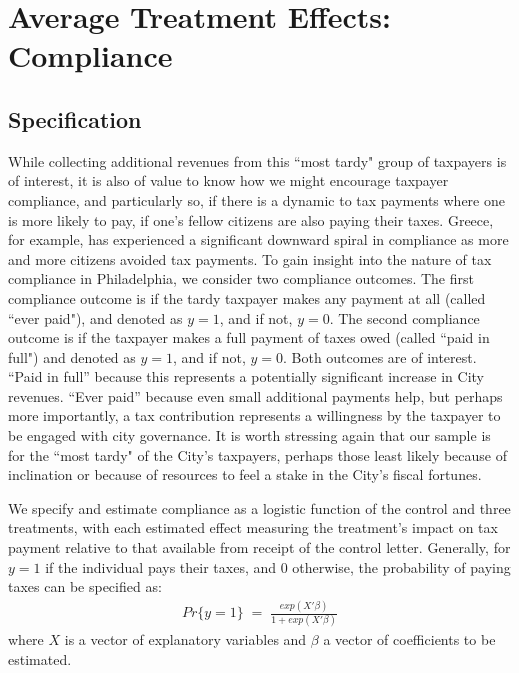 \documentclass[12pt,titlepage]{article}
\begin{document}
\section{Average Treatment Effects: Compliance}

\subsection{Specification}

While collecting additional revenues from this ``most tardy" group 
of taxpayers is of interest, it is also of value to know how we 
might encourage taxpayer compliance, and particularly so, if 
there is a dynamic to tax payments where one is more likely to 
pay, if one's fellow citizens are also paying their taxes.   
Greece, for example, has experienced a significant downward spiral 
in compliance as more and more citizens avoided tax payments.   
To gain insight into the nature of tax compliance in Philadelphia, 
we consider two compliance outcomes.   The first compliance outcome 
is if the tardy taxpayer makes any payment at all (called ``ever paid"), 
and denoted as $y = 1$, and if not, $y = 0$.   The second compliance 
outcome is if the taxpayer makes a full payment of taxes owed (called 
``paid in full") and denoted as $y = 1$, and if not, $y = 0$.  Both outcomes 
are of interest.  “Paid in full” because this represents a potentially 
significant increase in City revenues.   “Ever paid” because even small 
additional payments help, but perhaps more importantly, a tax 
contribution represents a willingness by the taxpayer to be engaged 
with city governance.  It is worth stressing again that our sample is 
for the ``most tardy" of the City's taxpayers, perhaps those least 
likely because of inclination or because of resources to feel a stake 
in the City's fiscal fortunes.    

We specify and estimate compliance
as a logistic function of the control and three treatments, with each
estimated effect measuring the treatment's impact on tax payment
relative to that available from receipt of the control letter.
Generally, for $y = 1$ if the individual pays their taxes, and 0
otherwise, the probability of paying taxes can be specified as:
\begin{eqnarray*}
Pr \{ y=1 \} \; = \; \frac{exp(X' \beta)}{1 + exp(X' \beta)}
\end{eqnarray*}
where $X$ is a vector of explanatory variables and $\beta$ a vector of
coefficients to be estimated.
\end{document}
